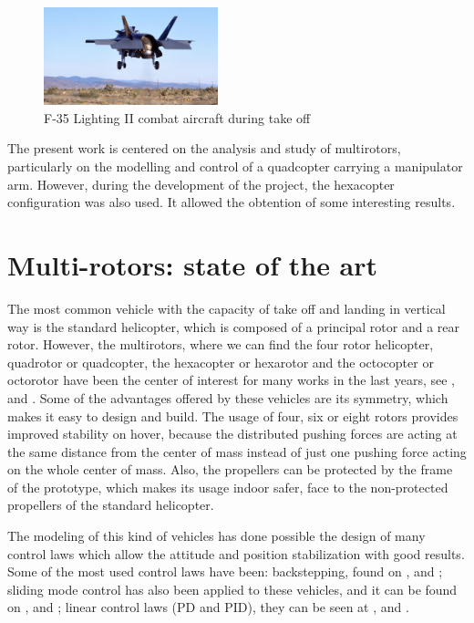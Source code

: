 \begin{itemize}
      \begin{figure}[h!]
        \centering
        \includegraphics[width=0.45\textwidth]{figures/f35.jpg}
        \caption{F-35 Lighting II combat aircraft during take off}\label{f35}
      \end{figure}

\end{itemize}

The present work is centered on the analysis and study of multirotors, particularly on the modelling and control of a quadcopter carrying a manipulator arm. However, during the development of the project, the hexacopter configuration was also used. It allowed the obtention of some interesting results.

\section{Multi-rotors: state of the art}

The most common vehicle with the capacity of take off and landing in vertical way is the standard helicopter, which is composed of a principal rotor and a rear rotor. However, the multirotors, where we can find the four rotor helicopter, quadrotor or quadcopter, the hexacopter or hexarotor and the octocopter or octorotor have been the center of interest for many works in the last years, see \cite{Guerrero:2011}, \cite{Alaimo:2013} and \cite{Fogelberg:2008}. Some of the advantages offered by these vehicles are its symmetry, which makes it easy to design and build. The usage of four, six or eight rotors provides improved stability on hover, because the distributed pushing forces are acting at the same distance from the center of mass instead of just one pushing force acting on the whole center of mass. Also, the propellers can be protected by the frame of the prototype, which makes its usage indoor safer, face to the non-protected propellers of the standard helicopter.

The modeling of this kind of vehicles has done possible the design of many control laws which allow the attitude and position stabilization with good results. Some of the most used control laws have been: backstepping, found on \cite{Bouabdallah:2005}, \cite{Abdelaziz:2006} and \cite{Wu:2010}; sliding mode control has also been applied to these vehicles, and it can be found on \cite{Bouabdallah:2005}, \cite{Zheng:2014} and \cite{Arellano:2013}; linear control laws (PD and PID), they can be seen at \cite{erginer:2007}, \cite{li:2011} and \cite{hoffmann:2007}.


